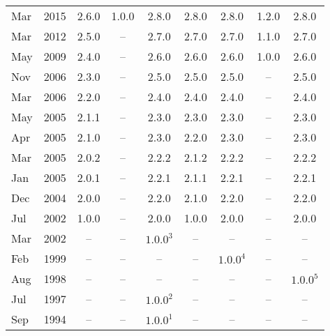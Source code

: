 \begin{xtabular}{|ll|c|c|c|c|c|c|c|}
Mar & 2015 & 2.6.0       & 1.0.0       & 2.8.0         & 2.8.0       & 2.8.0       & 1.2.0       & 2.8.0\\
Mar & 2012 & 2.5.0       & --          & 2.7.0         & 2.7.0       & 2.7.0       & 1.1.0       & 2.7.0\\
May & 2009 & 2.4.0       & --          & 2.6.0         & 2.6.0       & 2.6.0       & 1.0.0       & 2.6.0\\
Nov & 2006 & 2.3.0       & --          & 2.5.0         & 2.5.0       & 2.5.0       & --          & 2.5.0\\
Mar & 2006 & 2.2.0       & --          & 2.4.0         & 2.4.0       & 2.4.0       & --          & 2.4.0\\
May & 2005 & 2.1.1       & --          & 2.3.0         & 2.3.0       & 2.3.0       & --          & 2.3.0\\
Apr & 2005 & 2.1.0       & --          & 2.3.0         & 2.2.0       & 2.3.0       & --          & 2.3.0\\
Mar & 2005 & 2.0.2       & --          & 2.2.2         & 2.1.2       & 2.2.2       & --          & 2.2.2\\
Jan & 2005 & 2.0.1       & --          & 2.2.1         & 2.1.1       & 2.2.1       & --          & 2.2.1\\
Dec & 2004 & 2.0.0       & --          & 2.2.0         & 2.1.0       & 2.2.0       & --          & 2.2.0\\
Jul & 2002 & 1.0.0       & --          & 2.0.0         & 1.0.0       & 2.0.0       & --          & 2.0.0\\
Mar & 2002 & --          & --          & $1.0.0^3$     & --          & --          & --          & --\\
Feb & 1999 & --          & --          & --            & --          & $1.0.0^4$   & --          & --\\
Aug & 1998 & --          & --          & --            & --          & --          & --          & $1.0.0^5$\\
Jul & 1997 & --          & --          & $1.0.0^2$     & --          & --          & --          & --\\
Sep & 1994 & --          & --          & $1.0.0^1$     & --          & --          & --          & --\\
\end{xtabular}
